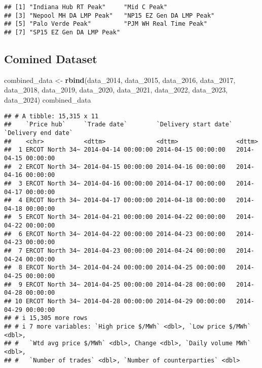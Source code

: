 \documentclass[
]{article}
\newenvironment{Shaded}{\begin{snugshade}}{\end{snugshade}}
\newcommand{\AttributeTok}[1]{\textcolor[rgb]{0.13,0.29,0.53}{#1}}
\newcommand{\CommentTok}[1]{\textcolor[rgb]{0.56,0.35,0.01}{\textit{#1}}}
\newcommand{\FunctionTok}[1]{\textcolor[rgb]{0.13,0.29,0.53}{\textbf{#1}}}
\newcommand{\NormalTok}[1]{#1}
\newcommand{\OtherTok}[1]{\textcolor[rgb]{0.56,0.35,0.01}{#1}}
\newcommand{\SpecialCharTok}[1]{\textcolor[rgb]{0.81,0.36,0.00}{\textbf{#1}}}
\newcommand{\StringTok}[1]{\textcolor[rgb]{0.31,0.60,0.02}{#1}}
\begin{document}
\begin{Shaded}
\end{Shaded}

\begin{verbatim}
## [1] "Indiana Hub RT Peak"     "Mid C Peak"             
## [3] "Nepool MH DA LMP Peak"   "NP15 EZ Gen DA LMP Peak"
## [5] "Palo Verde Peak"         "PJM WH Real Time Peak"  
## [7] "SP15 EZ Gen DA LMP Peak"
\end{verbatim}

\subsection{Comined Dataset}\label{comined-dataset}

\begin{Shaded}
\begin{Highlighting}[]
\NormalTok{combined\_data }\OtherTok{\textless{}{-}} \FunctionTok{rbind}\NormalTok{(data\_2014, data\_2015, data\_2016, data\_2017, data\_2018, data\_2019, data\_2020, data\_2021, data\_2022, data\_2023, data\_2024)}
\NormalTok{combined\_data}
\end{Highlighting}
\end{Shaded}

\begin{verbatim}
## # A tibble: 15,315 x 11
##    `Price hub`     `Trade date`        `Delivery start date` `Delivery end date`
##    <chr>           <dttm>              <dttm>                <dttm>             
##  1 ERCOT North 34~ 2014-04-14 00:00:00 2014-04-15 00:00:00   2014-04-15 00:00:00
##  2 ERCOT North 34~ 2014-04-15 00:00:00 2014-04-16 00:00:00   2014-04-16 00:00:00
##  3 ERCOT North 34~ 2014-04-16 00:00:00 2014-04-17 00:00:00   2014-04-17 00:00:00
##  4 ERCOT North 34~ 2014-04-17 00:00:00 2014-04-18 00:00:00   2014-04-18 00:00:00
##  5 ERCOT North 34~ 2014-04-21 00:00:00 2014-04-22 00:00:00   2014-04-22 00:00:00
##  6 ERCOT North 34~ 2014-04-22 00:00:00 2014-04-23 00:00:00   2014-04-23 00:00:00
##  7 ERCOT North 34~ 2014-04-23 00:00:00 2014-04-24 00:00:00   2014-04-24 00:00:00
##  8 ERCOT North 34~ 2014-04-24 00:00:00 2014-04-25 00:00:00   2014-04-25 00:00:00
##  9 ERCOT North 34~ 2014-04-25 00:00:00 2014-04-28 00:00:00   2014-04-28 00:00:00
## 10 ERCOT North 34~ 2014-04-28 00:00:00 2014-04-29 00:00:00   2014-04-29 00:00:00
## # i 15,305 more rows
## # i 7 more variables: `High price $/MWh` <dbl>, `Low price $/MWh` <dbl>,
## #   `Wtd avg price $/MWh` <dbl>, Change <dbl>, `Daily volume MWh` <dbl>,
## #   `Number of trades` <dbl>, `Number of counterparties` <dbl>
\end{verbatim}
\end{document}
